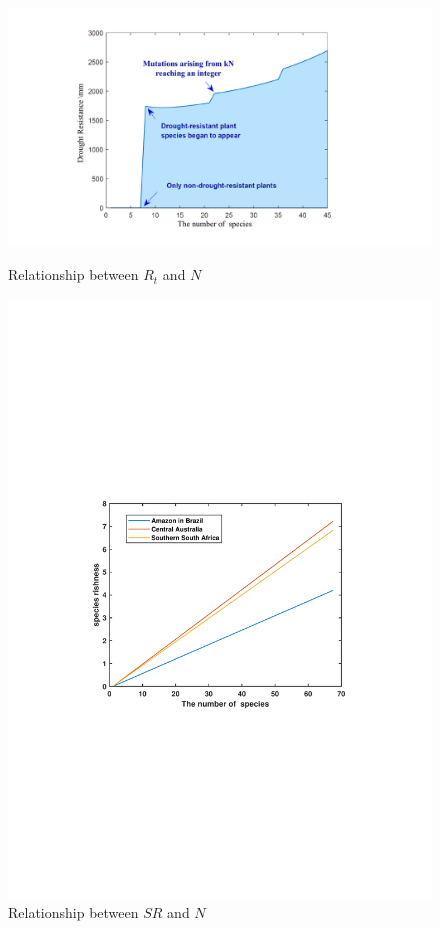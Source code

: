 \documentclass[12pt]{article}  %
\begin{document}
\begin{figure}[!htbp]
	\centering
	\begin{minipage}[t]{0.45\textwidth}
		\centering
		\includegraphics[width=1\textwidth]{easymcm/img/RT-N.pdf}
		\caption{Relationship between $R_t$ and $N$}
        \label{fig:rt-n}
	\end{minipage}
	\begin{minipage}[t]{0.45\textwidth}
		\centering
		\includegraphics[width=1\textwidth]{easymcm/img/Tree adress.pdf}
		\caption{Relationship between $SR$ and $N$}
        \label{fig:treeadd}
	\end{minipage}
\end{figure}
\end{document}
